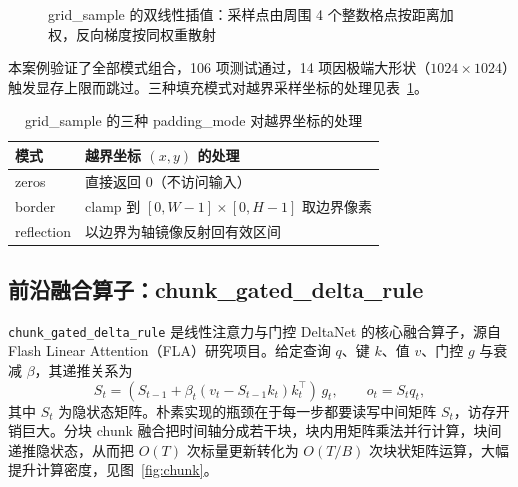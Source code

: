 \begin{figure}[!htbp]
\centering
{}
\caption{grid\_sample 的双线性插值：采样点由周围 4 个整数格点按距离加权，反向梯度按同权重散射}
\label{fig:grid}
\end{figure}

本案例验证了全部模式组合，106 项测试通过，14 项因极端大形状（$1024\times1024$）触发显存上限而跳过。三种填充模式对越界采样坐标的处理见表~\ref{tab:pad}。

\begin{table}[!htbp]
\centering\small
\caption{grid\_sample 的三种 padding\_mode 对越界坐标的处理}
\label{tab:pad}
\renewcommand{\arraystretch}{1.12}
\begin{tabularx}{\textwidth}{lX}
\toprule
模式 & 越界坐标 $(x,y)$ 的处理 \\
\midrule
zeros & 直接返回 0（不访问输入） \\
border & clamp 到 $[0, W{-}1]\times[0, H{-}1]$ 取边界像素 \\
reflection & 以边界为轴镜像反射回有效区间 \\
\bottomrule
\end{tabularx}
\end{table}

\subsection{前沿融合算子：chunk\_gated\_delta\_rule}
\texttt{chunk\_gated\_delta\_rule} 是线性注意力与门控 DeltaNet 的核心融合算子，源自 Flash Linear Attention（FLA）研究项目。给定查询 $q$、键 $k$、值 $v$、门控 $g$ 与衰减 $\beta$，其递推关系为
\[
S_t = (S_{t-1} + \beta_t (v_t - S_{t-1} k_t) k_t^\top)\, g_t, \qquad o_t = S_t q_t,
\]
其中 $S_t$ 为隐状态矩阵。朴素实现的瓶颈在于每一步都要读写中间矩阵 $S_t$，访存开销巨大。分块 chunk 融合把时间轴分成若干块，块内用矩阵乘法并行计算，块间递推隐状态，从而把 $O(T)$ 次标量更新转化为 $O(T/B)$ 次块状矩阵运算，大幅提升计算密度，见图~\ref{fig:chunk}。

